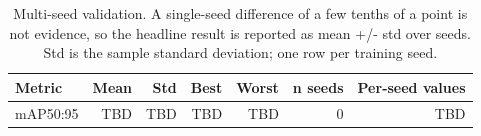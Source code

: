 \begin{table}[t]
\centering
\caption{Multi-seed validation. A single-seed difference of a few tenths of a point is not evidence, so the headline result is reported as mean +/- std over seeds. Std is the sample standard deviation; one row per training seed.}
\label{tab:multi_seed}
\begin{tabular}{lrrrrrr}
\toprule
Metric & Mean & Std & Best & Worst & n seeds & Per-seed values \\
\midrule
mAP50:95 & TBD & TBD & TBD & TBD & 0 & TBD \\
\bottomrule
\end{tabular}
\end{table}
